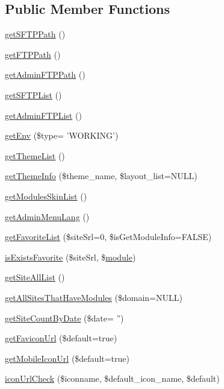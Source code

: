 \subsection*{Public Member Functions}
\begin{DoxyCompactItemize}
\item 
\hyperlink{classadminAdminModel_aaeac1a0a11439dfb4faa74751da8747e}{get\-S\-F\-T\-P\-Path} ()
\item 
\hyperlink{classadminAdminModel_a388c46fe906b6658eda70407ff9cdadb}{get\-F\-T\-P\-Path} ()
\item 
\hyperlink{classadminAdminModel_a155e29f18f17c6c657a457fcd65fd24b}{get\-Admin\-F\-T\-P\-Path} ()
\item 
\hyperlink{classadminAdminModel_adea58838b8595a28dc84d562bd1816ed}{get\-S\-F\-T\-P\-List} ()
\item 
\hyperlink{classadminAdminModel_a9e944aba1586e011811993745738728e}{get\-Admin\-F\-T\-P\-List} ()
\item 
\hyperlink{classadminAdminModel_afbd791a2932cb6f9f3d0550f4377829a}{get\-Env} (\$type= 'W\-O\-R\-K\-I\-N\-G')
\item 
\hyperlink{classadminAdminModel_a2a331c8f7fea9c12f56f5f5f75a3960c}{get\-Theme\-List} ()
\item 
\hyperlink{classadminAdminModel_afa7d3525c94669a9cdd141051213a765}{get\-Theme\-Info} (\$theme\-\_\-name, \$layout\-\_\-list=N\-U\-L\-L)
\item 
\hyperlink{classadminAdminModel_adde903c6e5edecd8b68b1afb232c92fe}{get\-Modules\-Skin\-List} ()
\item 
\hyperlink{classadminAdminModel_a6e21a5731925dc94cce1859dd96e7f25}{get\-Admin\-Menu\-Lang} ()
\item 
\hyperlink{classadminAdminModel_aa50a1de27a9e8431e5a17fffc053dc1e}{get\-Favorite\-List} (\$site\-Srl=0, \$is\-Get\-Module\-Info=F\-A\-L\-S\-E)
\item 
\hyperlink{classadminAdminModel_a6ba3dfaa5f5f1cc41284676b9e0b7b9d}{is\-Exists\-Favorite} (\$site\-Srl, \$\hyperlink{classmodule}{module})
\item 
\hyperlink{classadminAdminModel_a12f25a1c61e11bf727019171564b1cad}{get\-Site\-All\-List} ()
\item 
\hyperlink{classadminAdminModel_afca5a07a3f42ccc8c2f635557c668b44}{get\-All\-Sites\-That\-Have\-Modules} (\$domain=N\-U\-L\-L)
\item 
\hyperlink{classadminAdminModel_a7123fd762d0fbefec95c0fa6263ffd62}{get\-Site\-Count\-By\-Date} (\$date= '')
\item 
\hyperlink{classadminAdminModel_a94cadc80816d875f0713507d356c422b}{get\-Favicon\-Url} (\$default=true)
\item 
\hyperlink{classadminAdminModel_a3ebcb91feca1cf88d6ed0bce9355ca6b}{get\-Mobile\-Icon\-Url} (\$default=true)
\item 
\hyperlink{classadminAdminModel_ab77b7dd452e81ca285debe37a159e0d7}{icon\-Url\-Check} (\$iconname, \$default\-\_\-icon\-\_\-name, \$default)
\end{DoxyCompactItemize}

